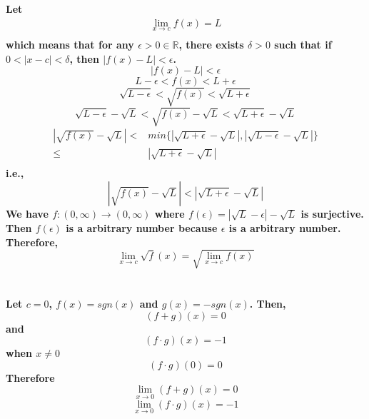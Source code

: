 \documentclass{article}
\begin{document}
    \section{}
        \paragraph{
            Let
            \begin{equation*}
                \begin{split}
                    \lim_{x\rightarrow c}f(x)=L\\
                \end{split}
            \end{equation*}
            which means that for any $\epsilon>0\in \mathbb{R}$, there exists $\delta>0$ such that if $0<|x-c|<\delta$, then $|f(x)-L|<\epsilon$.
            $$|f(x)-L|<\epsilon$$
            $$L-\epsilon<f(x)<L+\epsilon$$
            $$\sqrt{L-\epsilon}<\sqrt{f(x)}<\sqrt{L+\epsilon}$$
            $$\sqrt{L-\epsilon}-\sqrt{L}<\sqrt{f(x)}-\sqrt{L}<\sqrt{L+\epsilon}-\sqrt{L}$$
            \begin{equation*}
                \begin{split}
                    |\sqrt{f(x)}-\sqrt{L}|<&min\{|\sqrt{L+\epsilon}-\sqrt{L}|,|\sqrt{L-\epsilon}-\sqrt{L}|\}\\
                    \leq&|\sqrt{L+\epsilon}-\sqrt{L}|\\
                \end{split}
            \end{equation*}
            i.e.,
            $$|\sqrt{f(x)}-\sqrt{L}|<|\sqrt{L+\epsilon}-\sqrt{L}|$$
            We have $f:(0,\infty)\rightarrow (0,\infty)$ where $f(\epsilon)=|\sqrt{L}-\epsilon|-\sqrt{L}$ is surjective. Then $f(\epsilon)$ is a arbitrary number because $\epsilon$ is a arbitrary number. Therefore,
            $$\lim_{x\rightarrow c}\sqrt{f}(x)=\sqrt{\lim_{x\rightarrow c}f(x)}$$
        }

    \section{}
        \paragraph{
                Let $c=0$, $f(x)=sgn(x)$ and $g(x)=-sgn(x)$.
                Then, $$(f+g)(x)=0$$
                and 
                $$(f\cdot g)(x)=-1$$
                when $x\neq 0$
                $$(f\cdot g)(0)=0$$
                Therefore
                $$\lim_{x\rightarrow 0}(f+g)(x)=0$$
                $$\lim_{x\rightarrow 0}(f\cdot g)(x)=-1$$
        }
    
\end{document}

